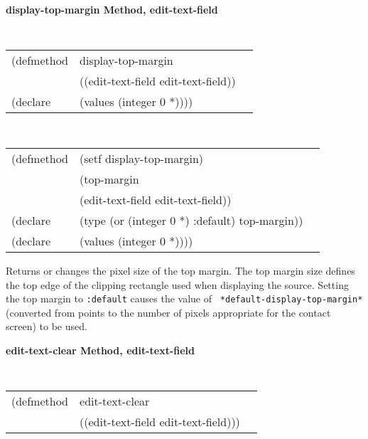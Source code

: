 {\samepage  
{\large {\bf display-top-margin \hfill Method, edit-text-field}}
\begin{flushright} \parbox[t]{6.125in}{
\tt
\begin{tabular}{lll}
\raggedright
(defmethod & display-top-margin & \\
& ((edit-text-field  edit-text-field)) \\
(declare & (values (integer 0 *))))
\end{tabular}
\rm

}\end{flushright}}

\begin{flushright} \parbox[t]{6.125in}{
\tt
\begin{tabular}{lll}
\raggedright
(defmethod & (setf display-top-margin) & \\
         & (top-margin \\
         & (edit-text-field  edit-text-field)) \\
(declare &(type (or (integer 0 *) :default)  top-margin))\\
(declare & (values (integer 0 *))))
\end{tabular}
\rm}
\end{flushright}

\begin{flushright} \parbox[t]{6.125in}{
Returns or changes the pixel size of the
top margin.  The top margin size defines
the top edge of the clipping rectangle used when displaying the source.
Setting the top margin to {\tt :default} causes the value of {\tt
*default-display-top-margin*} (converted from points to the number of pixels
appropriate for the contact screen) to be used.
}
\end{flushright}


{\samepage  
{\large {\bf edit-text-clear \hfill Method, edit-text-field}}
\begin{flushright} \parbox[t]{6.125in}{
\tt
\begin{tabular}{lll}
\raggedright
(defmethod & edit-text-clear & \\
& ((edit-text-field  edit-text-field)))
\end{tabular}
\rm

}\end{flushright}}



